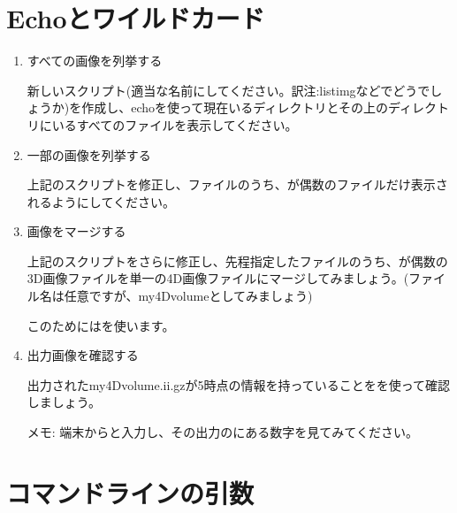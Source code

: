 \documentclass{jsarticle}
\begin{document}
\section{Echoとワイルドカード}

\begin{enumerate}
\item すべての画像を列挙する

新しいスクリプト(適当な名前にしてください。訳注:listimgなどでどうでしょうか)を作成し、echoを使って現在いるディレクトリとその上のディレクトリにいるすべての{\color{red}}ファイルを表示してください。

\item 一部の画像を列挙する

上記のスクリプトを修正し、{\color{red}}ファイルのうち、{\color{red}}が偶数のファイルだけ表示されるようにしてください。

\item 画像をマージする

上記のスクリプトをさらに修正し、先程指定した{\color{red}}ファイルのうち、{\color{red}}が偶数の3D画像ファイルを単一の4D画像ファイルにマージしてみましょう。(ファイル名は任意ですが、my4Dvolumeとしてみましょう)

このためには{\color{red}}を使います。

\item 出力画像を確認する

出力されたmy4Dvolume.ii.gzが5時点の情報を持っていることを{\color{red}}を使って確認しましょう。

メモ: 端末から{\color{red}}と入力し、その出力の{\color{red}}にある数字を見てみてください。

\end{enumerate}

\section {コマンドラインの引数}
\end{document}
